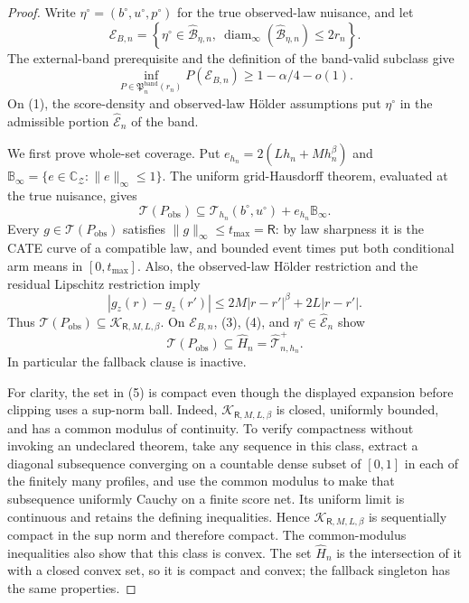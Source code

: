\documentclass{article}
\begin{document}
\begin{proof}
Write \(\eta^\circ=(b^\circ,u^\circ,p^\circ)\) for the true observed-law nuisance, and let
\[
\mathcal E_{B,n}=
\left\{\eta^\circ\in\widehat{\mathcal B}_{\eta,n},\
\operatorname{diam}_\infty(\widehat{\mathcal B}_{\eta,n})\leq2r_n\right\}.
\tag{1}
\]
The external-band prerequisite and the definition of the band-valid subclass give
\[
\inf_{P\in\mathfrak P_n^{\mathrm{band}}(r_n)}P(\mathcal E_{B,n})
\geq1-\alpha/4-o(1).
\tag{2}
\]
On (1), the score-density and observed-law H\"older assumptions put \(\eta^\circ\) in the admissible portion \(\widehat{\mathcal E}_n\) of the band.

We first prove whole-set coverage.  Put \(e_{h_n}=2(Lh_n+Mh_n^\beta)\) and \(\mathbb B_\infty=\{e\in\mathbb C_{\mathcal Z}:\|e\|_\infty\leq1\}\).  The uniform grid-Hausdorff theorem, evaluated at the true nuisance, gives
\[
\mathcal T(P_{\mathrm{obs}})
\subseteq\mathcal T_{h_n}(b^\circ,u^\circ)+e_{h_n}\mathbb B_\infty.
\tag{3}
\]
Every \(g\in\mathcal T(P_{\mathrm{obs}})\) satisfies \(\|g\|_\infty\leq t_{\max}=\mathsf R\): by law sharpness it is the CATE curve of a compatible law, and bounded event times put both conditional arm means in \([0,t_{\max}]\).  Also, the observed-law H\"older restriction and the residual Lipschitz restriction imply
\[
|g_z(r)-g_z(r')|
\leq2M|r-r'|^\beta+2L|r-r'|.
\tag{4}
\]
Thus \(\mathcal T(P_{\mathrm{obs}})\subseteq\mathcal K_{\mathsf R,M,L,\beta}\).  On \(\mathcal E_{B,n}\), (3), (4), and \(\eta^\circ\in\widehat{\mathcal E}_n\) show
\[
\mathcal T(P_{\mathrm{obs}})\subseteq\widehat H_n
=\widehat{\mathcal T}_{n,h_n}^{+}.
\tag{5}
\]
In particular the fallback clause is inactive.

For clarity, the set in (5) is compact even though the displayed expansion before clipping uses a sup-norm ball.  Indeed, \(\mathcal K_{\mathsf R,M,L,\beta}\) is closed, uniformly bounded, and has a common modulus of continuity.  To verify compactness without invoking an undeclared theorem, take any sequence in this class, extract a diagonal subsequence converging on a countable dense subset of \([0,1]\) in each of the finitely many profiles, and use the common modulus to make that subsequence uniformly Cauchy on a finite score net.  Its uniform limit is continuous and retains the defining inequalities.  Hence \(\mathcal K_{\mathsf R,M,L,\beta}\) is sequentially compact in the sup norm and therefore compact.  The common-modulus inequalities also show that this class is convex.  The set \(\widehat H_n\) is the intersection of it with a closed convex set, so it is compact and convex; the fallback singleton has the same properties.


\end{proof}
\end{document}
